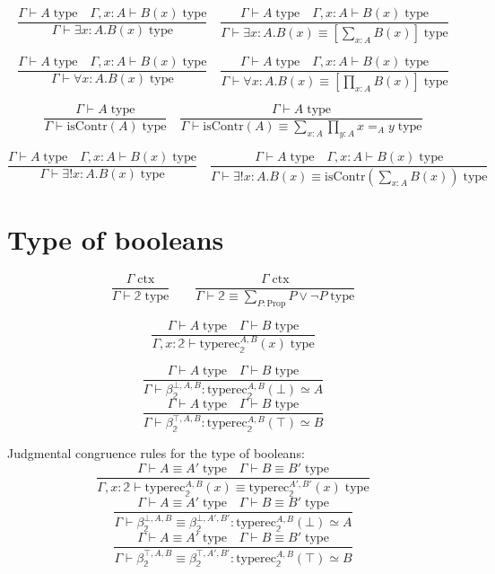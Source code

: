 \documentclass{book}
\begin{document}
$$\frac{\Gamma \vdash A \; \mathrm{type} \quad \Gamma, x:A \vdash B(x) \; \mathrm{type}}{\Gamma \vdash \exists x:A.B(x) \; \mathrm{type}} \quad \frac{\Gamma \vdash A \; \mathrm{type} \quad \Gamma, x:A \vdash B(x) \; \mathrm{type}}{\Gamma \vdash \exists x:A.B(x) \equiv \left[\sum_{x:A} B(x)\right] \; \mathrm{type}}$$

$$\frac{\Gamma \vdash A \; \mathrm{type} \quad \Gamma, x:A \vdash B(x) \; \mathrm{type}}{\Gamma \vdash \forall x:A.B(x) \; \mathrm{type}} \quad \frac{\Gamma \vdash A \; \mathrm{type} \quad \Gamma, x:A \vdash B(x) \; \mathrm{type}}{\Gamma \vdash \forall x:A.B(x) \equiv \left[\prod_{x:A} B(x)\right] \; \mathrm{type}}$$

$$\frac{\Gamma \vdash A \; \mathrm{type}}{\Gamma \vdash \mathrm{isContr}(A) \; \mathrm{type}} \quad \frac{\Gamma \vdash A \; \mathrm{type}}{\Gamma \vdash \mathrm{isContr}(A) \equiv \sum_{x:A} \prod_{y:A} x =_A y \; \mathrm{type}}$$

$$\frac{\Gamma \vdash A \; \mathrm{type} \quad \Gamma, x:A \vdash B(x) \; \mathrm{type}}{\Gamma \vdash \exists!x:A.B(x) \; \mathrm{type}} \quad \frac{\Gamma \vdash A \; \mathrm{type} \quad \Gamma, x:A \vdash B(x) \; \mathrm{type}}{\Gamma \vdash \exists!x:A.B(x) \equiv \mathrm{isContr}\left(\sum_{x:A} B(x)\right) \; \mathrm{type}}$$

\section{Type of booleans}

$$\frac{\Gamma \; \mathrm{ctx}}{\Gamma \vdash \mathbb{2} \; \mathrm{type}} \qquad \frac{\Gamma \; \mathrm{ctx}}{\Gamma \vdash \mathbb{2} \equiv \sum_{P:\mathrm{Prop}} P \vee \neg P \; \mathrm{type}}$$

$$\frac{\Gamma \vdash A \; \mathrm{type} \quad \Gamma \vdash B \; \mathrm{type}}{\Gamma, x:\mathbb{2} \vdash \mathrm{typerec}_\mathbb{2}^{A, B}(x) \; \mathrm{type}}$$

$$\frac{\Gamma \vdash A \; \mathrm{type} \quad \Gamma \vdash B \; \mathrm{type}}{\Gamma \vdash \beta_\mathbb{2}^{\bot, A, B}:\mathrm{typerec}_\mathbb{2}^{A, B}(\bot) \simeq A}$$
$$\frac{\Gamma \vdash A \; \mathrm{type} \quad \Gamma \vdash B \; \mathrm{type}}{\Gamma \vdash \beta_\mathbb{2}^{\top, A, B}:\mathrm{typerec}_\mathbb{2}^{A, B}(\top) \simeq B}$$

Judgmental congruence rules for the type of booleans:
$$\frac{\Gamma \vdash A \equiv A' \; \mathrm{type} \quad \Gamma \vdash B \equiv B' \; \mathrm{type}}{\Gamma, x:\mathbb{2} \vdash \mathrm{typerec}_\mathbb{2}^{A, B}(x) \equiv \mathrm{typerec}_\mathbb{2}^{A', B'}(x) \; \mathrm{type}}$$
$$\frac{\Gamma \vdash A \equiv A' \; \mathrm{type} \quad \Gamma \vdash B \equiv B' \; \mathrm{type}}{\Gamma \vdash \beta_\mathbb{2}^{\bot, A, B} \equiv \beta_\mathbb{2}^{\bot, A', B'}:\mathrm{typerec}_\mathbb{2}^{A, B}(\bot) \simeq A}$$
$$\frac{\Gamma \vdash A \equiv A' \; \mathrm{type} \quad \Gamma \vdash B \equiv B' \; \mathrm{type}}{\Gamma \vdash \beta_\mathbb{2}^{\top, A, B} \equiv \beta_\mathbb{2}^{\top, A', B'}:\mathrm{typerec}_\mathbb{2}^{A, B}(\top) \simeq B}$$
\end{document}
